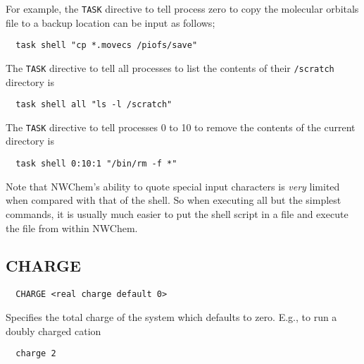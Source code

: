 For example, the \verb+TASK+ directive to tell process zero to copy the 
molecular orbitals file to a backup location can be input as follows;

\begin{verbatim}
  task shell "cp *.movecs /piofs/save"
\end{verbatim}

The \verb+TASK+ directive to tell all processes to list the contents of 
their \verb+/scratch+ directory is

\begin{verbatim}
  task shell all "ls -l /scratch"
\end{verbatim}

The \verb+TASK+ directive to tell processes 0 to 10 to remove the 
contents of the current directory is

\begin{verbatim}
  task shell 0:10:1 "/bin/rm -f *"
\end{verbatim}

Note that NWChem's ability to  quote
special input characters is {\em very} limited when compared with that
of the shell.  So when executing all 
but the simplest commands, it is usually much easier to put the shell 
script in a file and execute the file from within NWChem.

\subsection{CHARGE}
\label{sec:charge}

\begin{verbatim}
  CHARGE <real charge default 0>
\end{verbatim}

Specifies the total charge of the system which defaults to zero.
E.g., to run a doubly charged cation
\begin{verbatim}
  charge 2
\end{verbatim}
